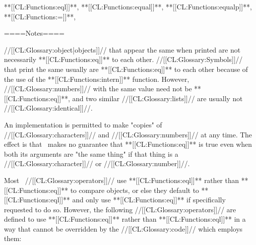 **[[CL:Functions:eql]]**, **[[CL:Functions:equal]]**, **[[CL:Functions:equalp]]**, **[[CL:Functions:=]]**, {\secref\Compilation}

====Notes====

//[[CL:Glossary:object|objects]]// that appear the same when printed are not necessarily **[[CL:Functions:eq]]** to each other. //[[CL:Glossary:Symbols]]// that print the same usually are **[[CL:Functions:eq]]** to each other because of the use of the **[[CL:Functions:intern]]** function. However, //[[CL:Glossary:numbers]]// with the same value need not be **[[CL:Functions:eq]]**, and two similar //[[CL:Glossary:lists]]// are usually not //[[CL:Glossary:identical]]//.

An implementation is permitted to make "copies" of //[[CL:Glossary:characters]]// and //[[CL:Glossary:numbers]]// at any time. The effect is that \clisp\ makes no guarantee that **[[CL:Functions:eq]]** is true even when both its arguments are "the same thing" if that thing is a //[[CL:Glossary:character]]// or //[[CL:Glossary:number]]//.

Most \clisp\ //[[CL:Glossary:operators]]// use **[[CL:Functions:eql]]** rather than **[[CL:Functions:eq]]** to compare objects, or else they default to **[[CL:Functions:eql]]** and only use **[[CL:Functions:eq]]** if specifically requested to do so. However, the following //[[CL:Glossary:operators]]// are defined to use **[[CL:Functions:eq]]** rather than **[[CL:Functions:eql]]** in a way that cannot be overridden by the //[[CL:Glossary:code]]// which employs them:


